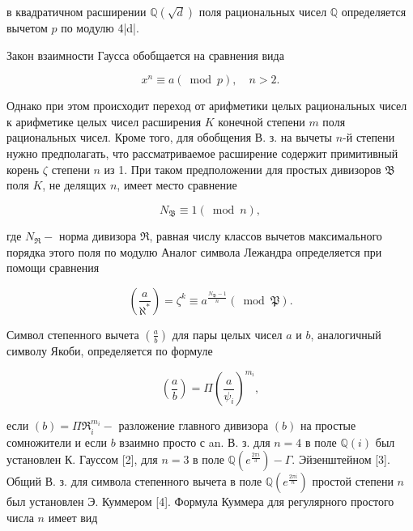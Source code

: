 \documentclass[10pt]{article}
\begin{document}
в квадратичном расширении $\mathbb{Q}(\sqrt{d})$ поля рациональных чисел $\mathbb{Q}$ определяется вычетом $p$ по модулю 4|d|.



Закон взаимности Гаусса обобщается на сравнения вида



\[

x^{n} \equiv a(\bmod p), \quad n>2 .

\]



Однако при этом происходит переход от арифметики целых рациональных чисел к арифметике целых чисел расширения $K$ конечной степени $m$ поля рациональных чисел. Кроме того, для обобщения В. з. на вычеты $n$-й степени нужно предполагать, что рассматриваемое расширение содержит примитивный корень $\zeta$ степени $n$ из 1. При таком предположении для простых дивизоров $\mathfrak{B}$ поля $K$, не делящих $n$, имеет место сравнение



\[

N_{\mathfrak{B}} \equiv 1(\bmod n),

\]



где $N_{\Re}-$ норма дивизора $\mathfrak{\Re}$, равная числу классов вычетов максимального порядка этого поля по модулю Аналог символа Лежандра определяется при помощи сравнения



\[

\left(\frac{a}{\aleph^{*}}\right)=\zeta^{k} \equiv a^{\frac{N_{\mathfrak{B}}-1}{n}}(\bmod \mathfrak{P}) .

\]



Символ степенного вычета $\left(\frac{a}{b}\right)$ для пары целых чисел $a$ и $b$, аналогичный символу Якоби, определяется по формуле



\[

\left(\frac{a}{b}\right)=\Pi\left(\frac{a}{\psi_{i}}\right)^{m_{i}},

\]



если $(b)=\Pi \Re_{i}^{m_{i}}-$ разложение главного дивизора $(b)$ на простые сомножители и если $b$ взаимно просто с an. В. з. для $n=4$ в поле $\mathbb{Q}(i)$ был установлен К. Гауссом [2], для $n=3$ в поле $\mathbb{Q}\left(e^{\frac{2 \pi i}{3}}\right)-\Gamma$. Эйзенштейном [3]. Общий В. з. для символа степенного вычета в поле $\mathbb{Q}\left(e^{\frac{2 \pi i}{n}}\right)$ простой степени $n$ был установлен Э. Куммером [4]. Формула Куммера для регулярного простого числа $n$ имеет вид
\end{document}
